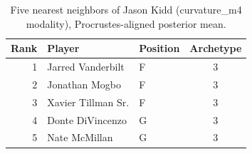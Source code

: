 \begin{table}[htbp]
  \centering\small
  \begin{tabular}{rllc}
    \toprule
    Rank & Player & Position & Archetype \\
    \midrule
    1 & Jarred Vanderbilt & F & 3 \\
    2 & Jonathan Mogbo & F & 3 \\
    3 & Xavier Tillman Sr. & F & 3 \\
    4 & Donte DiVincenzo & G & 3 \\
    5 & Nate McMillan & G & 3 \\
    \bottomrule
  \end{tabular}
  \caption{Five nearest neighbors of Jason Kidd (curvature_m4 modality), Procrustes-aligned posterior mean.}
  \label{tab:Jason_Kidd_neighbors_curvature_m4}
\end{table}

